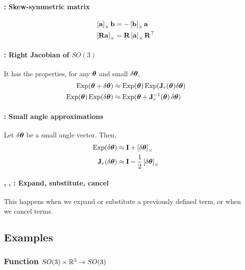 \paragraph{\ccross : Skew-symmetric matrix}
%
\begin{align}
\hatx{\bfa}\bfb &= -\hatx{\bfb}\bfa 
\\
\hatx{\bfR\bfa} &= \bfR\hatx{\bfa}\bfR\tr 
\end{align}

\paragraph{\cJr : Right Jacobian of $SO(3)$ }

It has the properties, for any $\bth$ and small $\dth$,
%
\begin{align}
\Exp(\bth+\dth) &\approx \Exp(\bth)\Exp(\bfJ_r(\bth)\dth) \\
\Exp(\bth)\Exp(\dth) &\approx \Exp(\bth+\bfJ_r\inv(\bth)\,\dth) 
\end{align}
%






\paragraph{\csmall : Small angle approximations}

Let $\dth$ be a small angle vector. Then,
%
\begin{align}
\Exp(\dth) &\approx \bfI + \hatx{\dth} \\
\bfJ_r(\dth) &\approx \bfI - \frac12\hatx{\dth} 
\end{align}



\paragraph{\cexpand, \csubst, \ccancel : Expand, substitute, cancel} This happens when we expand or substitute a previously defined term, or when we cancel terms.



\subsection{Examples}

\subsubsection{Function $SO(3)\times\bbR^3\to SO(3)$} 
\label{sec:jac_R3toSO3}


